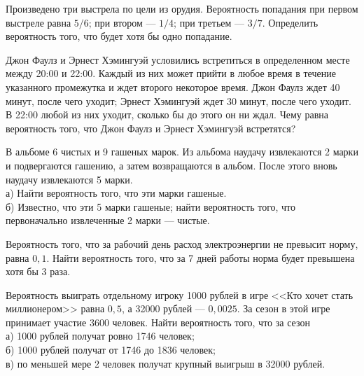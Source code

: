 \newpage\setcounter{zad}{0}



\begin{zkrW}{20}\noindent 
	Произведено три выстрела по цели из орудия. Вероятность попадания при первом выстреле равна $5/6$; при втором --- $1/4$; при третьем --- $3/7$. Определить вероятность того, что будет хотя бы одно попадание.
 
\end{zkrW}

\begin{zkrW}{20}\noindent 
	Джон Фаулз и Эрнест Хэмингуэй условились встретиться в определенном месте между 20:00 и 22:00. Каждый из них может прийти в любое время в течение указанного промежутка и ждет второго некоторое время. Джон Фаулз ждет 40 минут, после чего уходит; Эрнест Хэмингуэй ждет 30 минут, после чего уходит. В 22:00 любой из них уходит, сколько бы до этого он ни ждал. Чему равна вероятность того, что Джон Фаулз и Эрнест Хэмингуэй встретятся?
 
\end{zkrW}

\begin{zkrW}{20}\noindent 
	В альбоме 6 чистых и 9 гашеных марок. Из альбома наудачу извлекаются 2 марки и подвергаются гашению, а затем возвращаются в альбом. После этого вновь наудачу извлекаются 5 марки. \\ \indent а) Найти вероятность того, что эти марки гашеные. \\ \indent б) Известно, что эти 5 марки гашеные; найти вероятность того, что первоначально извлеченные 2 марки --- чистые.
 
\end{zkrW}

\begin{zkrW}{20}\noindent 
	Вероятность того, что за рабочий день расход электроэнергии не превысит норму, равна $0{,}1$. Найти вероятность того, что за 7 дней работы норма будет превышена хотя бы 3 раза.
 
\end{zkrW}

\begin{zkrW}{20}\noindent 
	Вероятность выиграть отдельному игроку 1000 рублей в игре <<Кто хочет стать миллионером>> равна $0{,}5$, а 32000 рублей --- $0{,}0025$. За сезон в этой игре принимает участие 3600 человек. Найти вероятность того, что за сезон \\ \indent а) 1000 рублей получат ровно 1746 человек; \\ \indent б) 1000 рублей получат от 1746 до 1836 человек; \\ \indent в) по меньшей мере 2 человек получат крупный выигрыш в 32000 рублей.
 
\end{zkrW}

